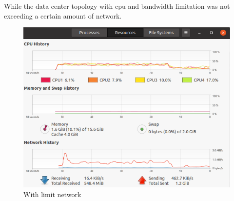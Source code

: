 \documentclass{article}
\begin{document}
\label{2}
While the data center topology with cpu and bandwidth limitation was not exceeding a certain amount of network.

\begin{figure}[h]
\centerline{\includegraphics[scale=0.5]{DDOSperformance1.PNG}}
\caption{With limit network}
\label{fig}
\end{figure}
\end{document}
